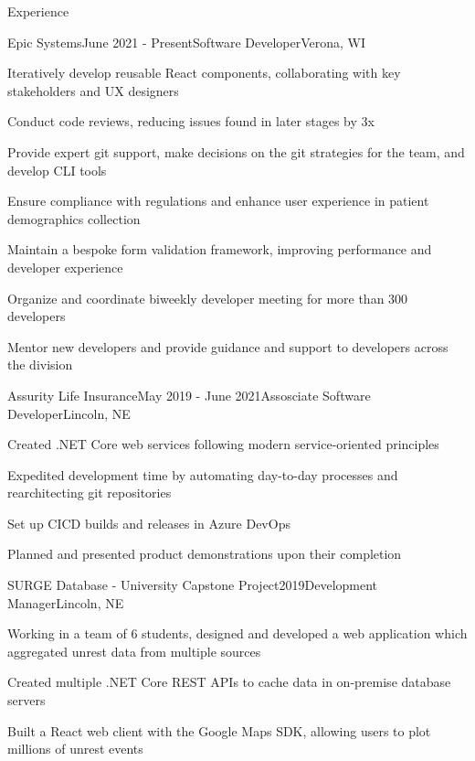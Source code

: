 \documentclass[
	11pt, %
]{article} %
\begin{document}
\begin{rSection}{Experience}

	\begin{rSubsection}{Epic Systems}{June 2021 - Present}{Software Developer}{Verona, WI}
		\item Iteratively develop reusable React components, collaborating with key stakeholders and UX designers
		\item Conduct code reviews, reducing issues found in later stages by 3x
		\item Provide expert git support, make decisions on the git strategies for the team, and develop CLI tools
		\item Ensure compliance with regulations and enhance user experience in patient demographics collection
		\item Maintain a bespoke form validation framework, improving performance and developer experience
		\item Organize and coordinate biweekly developer meeting for more than 300 developers
		\item Mentor new developers and provide guidance and support to developers across the division
	\end{rSubsection}

	\begin{rSubsection}{Assurity Life Insurance}{May 2019 - June 2021}{Assosciate Software Developer}{Lincoln, NE}
		\item Created .NET Core web services following modern service-oriented principles
		\item Expedited development time by automating day-to-day processes and rearchitecting git repositories
		\item Set up CICD builds and releases in Azure DevOps
		\item Planned and presented product demonstrations upon their completion
	\end{rSubsection}

	\begin{rSubsection}{SURGE Database - University Capstone Project}{2019}{Development Manager}{Lincoln, NE}
		\item Working in a team of 6 students, designed and developed a web application which aggregated unrest data from multiple sources
		\item Created multiple .NET Core REST APIs to cache data in on-premise database servers
		\item Built a React web client with the Google Maps SDK, allowing users to plot millions of unrest events
	\end{rSubsection}

\end{rSection}
\end{document}
